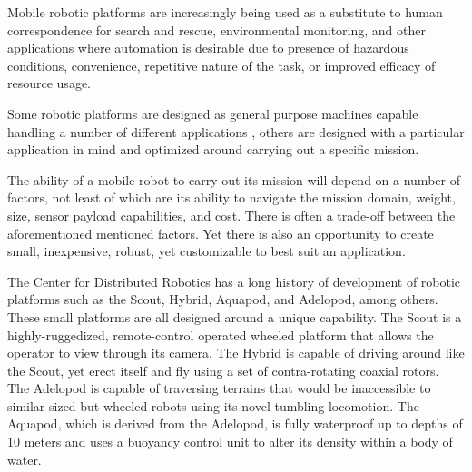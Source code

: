 Mobile robotic platforms are increasingly being used as a substitute to human correspondence for search and rescue, environmental monitoring, and other applications where automation is desirable due to presence of hazardous conditions, convenience, repetitive nature of the task, or improved efficacy of resource usage. 

Some robotic platforms are designed as general purpose machines capable handling a number of different applications \cite{Yamauchi2004, Dudek2007}, others are designed with a particular application in mind and \cite{Rybski2000} optimized around carrying out a specific mission. 



The ability of a mobile robot to carry out its mission will depend on a number of factors, not least of which are its ability to navigate the mission domain, weight, size, sensor payload capabilities, and cost. There is often a trade-off between the aforementioned mentioned factors. Yet there is also an opportunity to create small, inexpensive, robust, yet customizable to best suit an application. 




The Center for Distributed Robotics has a long history of development of robotic platforms such as the Scout, Hybrid, Aquapod, and Adelopod, among others. These small platforms are all designed around a unique capability. The Scout is a highly-ruggedized, remote-control operated wheeled platform that allows the operator to view through its camera. The Hybrid is capable of driving around like the Scout, yet erect itself and fly using a set of contra-rotating coaxial rotors. The Adelopod is capable of traversing terrains that would be inaccessible to similar-sized but wheeled robots using its novel tumbling locomotion. The Aquapod, which is derived from the Adelopod, is fully waterproof up to depths of 10 meters and uses a buoyancy control unit to alter its density within a body of water. 

